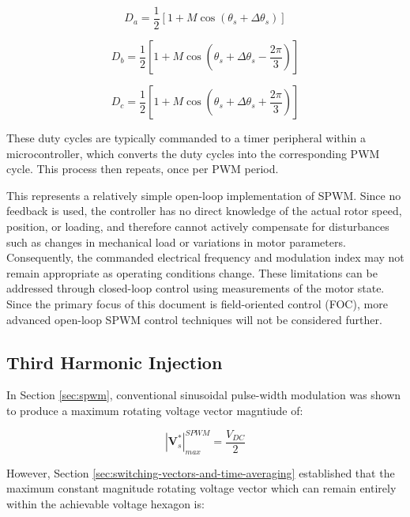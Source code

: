 \documentclass{article}
\begin{document}
\begin{equation}
    D_a = \frac{1}{2}[1 + M\cos(\theta_s + \Delta\theta_s)]
\end{equation}

\begin{equation}
    D_b = \frac{1}{2}[1 + M\cos(\theta_s + \Delta\theta_s - \frac{2\pi}{3})]
\end{equation}

\begin{equation}
    D_c = \frac{1}{2}[1 + M\cos(\theta_s + \Delta\theta_s + \frac{2\pi}{3})]
\end{equation}

These duty cycles are typically commanded to a timer peripheral within a microcontroller, which converts the duty cycles into the corresponding PWM cycle. This process then repeats, once per PWM period. 

This represents a relatively simple open-loop implementation of SPWM. Since no feedback is used, the controller has no direct knowledge of the actual rotor speed, position, or loading, and therefore cannot actively compensate for disturbances such as changes in mechanical load or variations in motor parameters. Consequently, the commanded electrical frequency and modulation index may not remain appropriate as operating conditions change. These limitations can be addressed through closed-loop control using measurements of the motor state. Since the primary focus of this document is field-oriented control (FOC), more advanced open-loop SPWM control techniques will not be considered further.


\subsection{Third Harmonic Injection}
\label{sec:third-harmonic-injection}

In Section \ref{sec:spwm}, conventional sinusoidal pulse-width modulation was shown to produce a maximum rotating voltage vector magntiude of:

\begin{equation}
    |\mathbf{V}_s^*|_{max}^{SPWM} = \frac{V_{DC}}{2}
\end{equation}

However, Section \ref{sec:switching-vectors-and-time-averaging} established that the maximum constant magnitude rotating voltage vector which can remain entirely within the achievable voltage hexagon is:
\end{document}

